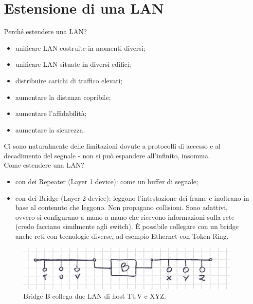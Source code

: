 \section*{Estensione di una LAN}
\noindent Perché estendere una LAN?
\begin{itemize}
    \item unificare LAN costruite in momenti diversi;
    \item unificare LAN situate in diversi edifici; 
    \item distribuire carichi di traffico elevati;
    \item aumentare la distanza copribile;
    \item aumentare l'affidabilità;
    \item aumentare la sicurezza.
\end{itemize}
\noindent Ci sono naturalmente delle limitazioni dovute a protocolli di accesso e al decadimento del segnale - non si può espandere all'infinito, insomma.\\
\noindent Come estendere una LAN?
\begin{itemize}
    \item con dei Repeater (Layer 1 device): come un buffer di segnale;
    \item  con dei Bridge (Layer 2 device): leggono l'intestazione dei frame e inoltrano in base al contenuto che leggono. Non propagano collisioni. Sono adattivi, ovvero si configurano a mano a mano che ricevono informazioni sulla rete (credo facciano similmente agli switch). È possibile collegare con un bridge anche reti con tecnologie diverse, ad esempio Ethernet con Token Ring.
\end{itemize}

\begin{figure} [ht]
    \centering
    \includegraphics[width=0.75\linewidth]{Figures//06/bridge.png}
    \caption{Bridge B collega due LAN di host TUV e XYZ.}
    \label{fig:06bridge}
\end{figure}

